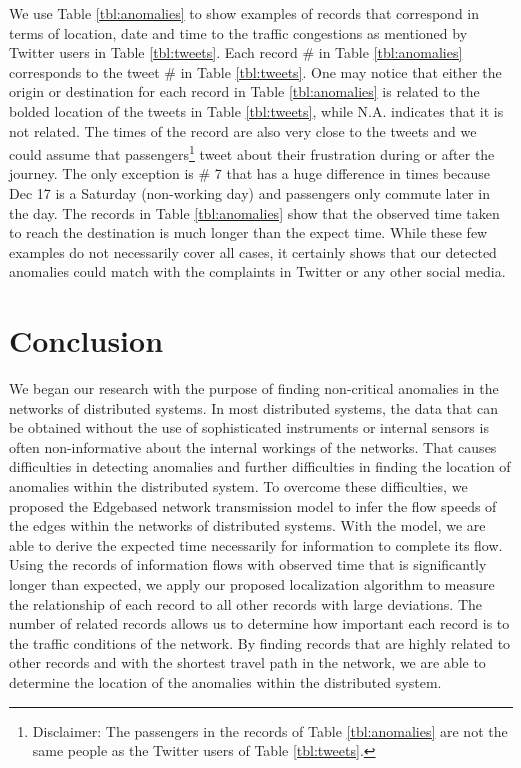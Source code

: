 \documentclass[conference]{IEEEtran.1.8}
\begin{document}
We use Table \ref{tbl:anomalies} to show examples of records that correspond in terms of location, date and time to the traffic congestions as mentioned by Twitter users in Table \ref{tbl:tweets}. Each record \# in Table \ref{tbl:anomalies} corresponds to the tweet \# in Table \ref{tbl:tweets}. One may notice that either the origin or destination for each record in Table \ref{tbl:anomalies} is related to the bolded location of the tweets in Table \ref{tbl:tweets}, while N.A. indicates that it is not related. The times of the record are also very close to the tweets and we could assume that passengers\footnote{Disclaimer: The passengers in the records of Table \ref{tbl:anomalies} are not the same people as the Twitter users of Table \ref{tbl:tweets}.} tweet about their frustration during or after the journey. The only exception is \# 7 that has a huge difference in times because Dec 17 is a Saturday (non-working day) and passengers only commute later in the day. The records in Table \ref{tbl:anomalies} show that the observed time taken to reach the destination is much longer than the expect time. While these few examples do not necessarily cover all cases, it certainly shows that our detected anomalies could match with the complaints in Twitter or any other social media.

\section{Conclusion}

We began our research with the purpose of finding non-critical anomalies in the networks of distributed systems. In most distributed systems, the data that can be obtained without the use of sophisticated instruments or internal sensors is often non-informative about the internal workings of the networks. That causes difficulties in detecting anomalies and further difficulties in finding the location of anomalies within the distributed system. To overcome these difficulties, we proposed the Edgebased network transmission model to infer the flow speeds of the edges within the networks of distributed systems. With the model, we are able to derive the expected time necessarily for information to complete its flow. Using the records of information flows with observed time that is significantly longer than expected, we apply our proposed localization algorithm to measure the relationship of each record to all other records with large deviations. The number of related records allows us to determine how important each record is to the traffic conditions of the network. By finding records that are highly related to other records and with the shortest travel path in the network, we are able to determine the location of the anomalies within the distributed system.
\end{document}
